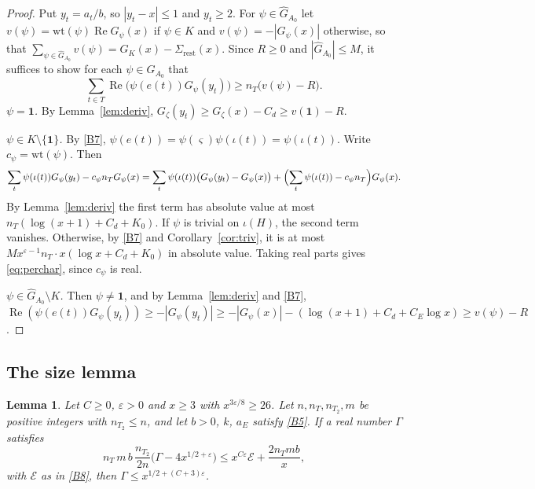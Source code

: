 \documentclass[11pt]{amsart}
\newcommand{\eps}{\varepsilon}
\newcommand{\re}{\operatorname{Re}}
\newcommand{\Gh}{\widehat{G}}
\theoremstyle{plain}
\newtheorem{lemma}[theorem]{Lemma}
\theoremstyle{definition}
\numberwithin{equation}{section}
\begin{document}
\begin{proof}
Put $y_t=a_t/b$, so $|y_t-x|\le1$ and $y_t\ge2$. For $\psi\in\Gh_{A_0}$ let
$v(\psi)=\mathrm{wt}(\psi)\re G_\psi(x)$ if $\psi\in K$ and $v(\psi)=-|G_\psi(x)|$ otherwise, so
that $\sum_{\psi\in\Gh_{A_0}}v(\psi)=G_K(x)-\Sigma_{\mathrm{rest}}(x)$. Since $R\ge0$ and
$|\Gh_{A_0}|\le M$, it suffices to show for each $\psi\in\Gh_{A_0}$ that
\begin{equation}\label{eq:perchar}
\sum_{t\in T}\re\bigl(\psi(e(t))G_\psi(y_t)\bigr)\ge n_T\bigl(v(\psi)-R\bigr).
\end{equation}
\emph{$\psi=\mathbf 1$.} By Lemma~\ref{lem:deriv}, $G_\zeta(y_t)\ge G_\zeta(x)-C_d\ge v(\mathbf 1)-R$.

\emph{$\psi\in K\setminus\{\mathbf 1\}$.} By \ref{B7}, $\psi(e(t))=\psi(\varsigma)\psi(\iota(t))=\psi(\iota(t))$.
Write $c_\psi=\mathrm{wt}(\psi)$. Then
\[
\sum_t\psi(\iota(t))G_\psi(y_t)-c_\psi n_TG_\psi(x)=\sum_t\psi(\iota(t))\bigl(G_\psi(y_t)-G_\psi(x)\bigr)+\Bigl(\sum_t\psi(\iota(t))-c_\psi n_T\Bigr)G_\psi(x).
\]
By Lemma~\ref{lem:deriv} the first term has absolute value at most $n_T(\log(x+1)+C_d+K_0)$.
If $\psi$ is trivial on $\iota(H)$, the second term vanishes. Otherwise, by \ref{B7} and
Corollary~\ref{cor:triv}, it is at most $Mx^{\eps-1}n_T\cdot x(\log x+C_d+K_0)$ in absolute value.
Taking real parts gives \eqref{eq:perchar}, since $c_\psi$ is real.

\emph{$\psi\in\Gh_{A_0}\setminus K$.} Then $\psi\neq\mathbf 1$, and by Lemma~\ref{lem:deriv} and
\ref{B7}, $\re(\psi(e(t))G_\psi(y_t))\ge-|G_\psi(y_t)|\ge-|G_\psi(x)|-(\log(x+1)+C_d+C_E\log x)\ge v(\psi)-R$.
\end{proof}

\subsection{The size lemma}

\begin{lemma}\label{lem:size}
Let $C\ge0$, $\eps>0$ and $x\ge3$ with $x^{3\eps/8}\ge26$. Let $n,n_T,n_{T_2},m$ be positive
integers with $n_{T_2}\le n$, and let $b>0$, $k$, $a_E$ satisfy \ref{B5}. If a real number $\Gamma$
satisfies
\[
n_T\,m\,b\,\frac{n_{T_2}}{2n}\bigl(\Gamma-4x^{1/2+\eps}\bigr)\le x^{C\eps}\mathcal E+\frac{2n_Tmb}{x},
\]
with $\mathcal E$ as in \ref{B8}, then $\Gamma\le x^{1/2+(C+3)\eps}$.
\end{lemma}
\end{document}
